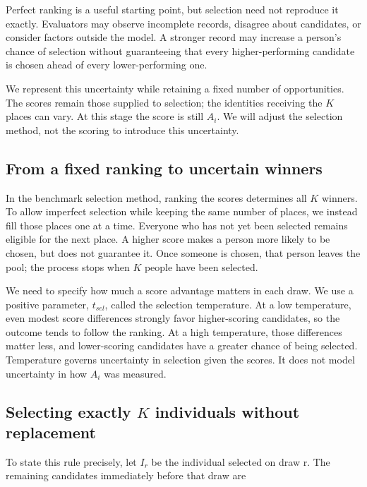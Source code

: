 Perfect ranking is a useful starting point, but selection need not reproduce it exactly. Evaluators may observe incomplete records, disagree about candidates, or consider factors outside the model. A stronger record may increase a person's chance of selection without guaranteeing that every higher-performing candidate is chosen ahead of every lower-performing one.

We represent this uncertainty while retaining a fixed number of opportunities. The scores remain those supplied to selection; the identities receiving the \(K\) places can vary. At this stage the score is still \(A_{i}\). We will adjust the selection method, not the scoring to introduce this uncertainty.

\subsection{From a fixed ranking to uncertain winners}\label{from-a-fixed-ranking-to-uncertain-winners}

In the benchmark selection method, ranking the scores determines all \(K\) winners. To allow imperfect selection while keeping the same number of places, we instead fill those places one at a time. Everyone who has not yet been selected remains eligible for the next place. A higher score makes a person more likely to be chosen, but does not guarantee it. Once someone is chosen, that person leaves the pool; the process stops when \(K\) people have been selected.

We need to specify how much a score advantage matters in each draw. We use a positive parameter, \(t_{sel}\), called the selection temperature. At a low temperature, even modest score differences strongly favor higher-scoring candidates, so the outcome tends to follow the ranking. At a high temperature, those differences matter less, and lower-scoring candidates have a greater chance of being selected. Temperature governs uncertainty in selection given the scores. It does not model uncertainty in how \(A_i\) was measured.

\subsection{\texorpdfstring{Selecting exactly \(K\) individuals without replacement}{Selecting exactly K individuals without replacement}}\label{selecting-exactly-k-individuals-without-replacement}

To state this rule precisely, let \(I_{r}\) be the individual selected on draw r. The remaining candidates immediately before that draw are

